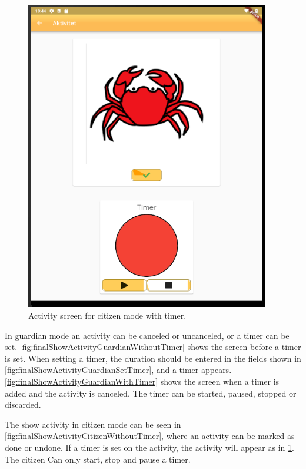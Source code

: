 \begin{figure}[H]
\begin{center}
        \includegraphics[width=0.95\textwidth]{figures/FinalScreen/showActivityCitizenWithTimer.png}
    \end{center}
    \caption{Activity screen for citizen mode with timer.}
    \label{fig:finalShowActivityCitizenWithTimer}
\end{figure}

In guardian mode an activity can be canceled or uncanceled, or a timer can be set. \ref{fig:finalShowActivityGuardianWithoutTimer} shows the screen before a timer is set. When setting a timer, the duration should be entered in the fields shown in \ref{fig:finalShowActivityGuardianSetTimer}, and a timer appears. \ref{fig:finalShowActivityGuardianWithTimer} shows the screen when a timer is added and the activity is canceled. The timer can be started, paused, stopped or discarded.

The show activity in citizen mode can be seen in \ref{fig:finalShowActivityCitizenWithoutTimer}, where an activity can be marked as done or undone. If a timer is set on the activity, the activity will appear as in \ref{fig:finalShowActivityCitizenWithTimer}. The citizen Can only start, stop and pause a timer. 

